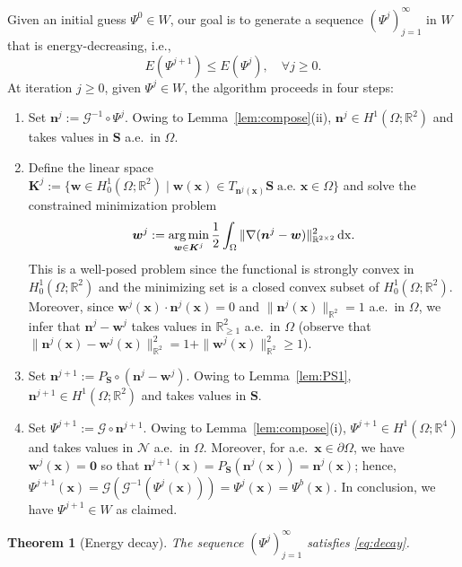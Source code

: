 \documentclass[a4paper,11pt]{article}
\newtheorem{theorem}{Theorem}[section]
\theoremstyle{definition}
\theoremstyle{remark}
\numberwithin{equation}{section}
\newcommand{\dx}{\,{\rm dx}}
\newcommand{\Real}{\mathbb{R}}
\newcommand{\bn}{{\boldsymbol n}}
\newcommand{\bw}{{\boldsymbol w}}
\newcommand{\bx}{{\boldsymbol x}}
\newcommand{\bK}{{\boldsymbol K}}
\newcommand{\bS}{{\boldsymbol S}}
\newcommand{\bzero}{{\boldsymbol 0}}
\newcommand{\calG}{\mathcal{G}}
\newcommand{\calN}{\mathcal{N}}
\DeclareMathOperator*{\argmin}{arg\,min}
\newcommand{\SCAL}{{\cdot}}
\begin{document}
Given an initial guess $\Psi^0\in W$, our goal is to generate a sequence $(\Psi^j)_{j=1}^\infty$ in $W$ that is energy-decreasing, i.e.,
\begin{equation} \label{eq:decay}
E(\Psi^{j+1}) \le E(\Psi^j), \quad \forall j\ge0.
\end{equation}
At iteration $j\ge0$, given $\Psi^j\in W$, 
the algorithm proceeds in four steps:
\begin{enumerate}
\item Set $\bn^j:= \calG^{-1} \circ \Psi^j$. Owing to Lemma~\ref{lem:compose}(ii), $\bn^j  \in H^1(\Omega;\Real^2)$ and takes values in $\bS$ a.e.~in $\Omega$.
\item Define the linear space $\bK^j := \{\bw \in H^1_0(\Omega;\Real^2)\;|\;
\bw(\bx) \in T_{\bn^j(\bx)}\bS \; \text{a.e. $\bx\in\Omega$}\}$ and solve the constrained minimization problem
\begin{equation} \label{eq:min_step2}
\bw^j := \argmin_{\bw \in \bK^j} \frac12 \int_\Omega \|\nabla (\bn^j-\bw)\|_{\Real^{2\times 2}}^2 \dx.
\end{equation}
This is a well-posed problem since the functional is strongly convex in $H^1_0(\Omega;\Real^2)$ and the minimizing set is a closed convex subset of $H^1_0(\Omega;\Real^2)$. Moreover, since $\bw^j(\bx)\SCAL \bn^j(\bx)=0$ and $\|\bn^j(\bx)\|_{\Real^2}=1$ a.e.~in $\Omega$, we infer that $\bn^j-\bw^j$ takes values in $\Real^2_{\ge1}$ a.e.~in $\Omega$ (observe that $\|\bn^j(\bx)-\bw^j(\bx)\|_{\Real^2}^2 = 1 + \|\bw^j(\bx)\|_{\Real^2}^2 \ge 1$).
\item Set $\bn^{j+1}:= P_{\bS} \circ (\bn^j-\bw^j)$. Owing to Lemma~\ref{lem:PS1}, $\bn^{j+1}\in H^1(\Omega;\Real^2)$ and takes values in $\bS$.
\item Set $\Psi^{j+1}:=\calG \circ \bn^{j+1}$. Owing to Lemma~\ref{lem:compose}(i), $\Psi^{j+1}  \in H^1(\Omega;\Real^4)$ and takes values in $\calN$ a.e.~in $\Omega$. Moreover, for a.e.~$\bx\in\partial\Omega$, we have $\bw^j(\bx)=\bzero$ so that $\bn^{j+1}(\bx)=P_{\bS}(\bn^j(\bx))=\bn^j(\bx)$; hence, $\Psi^{j+1}(\bx) = \calG(\calG^{-1}(\Psi^j(\bx))) = \Psi^j(\bx) = \Psi^b(\bx)$. In conclusion, we have $\Psi^{j+1}\in W$ as claimed.
\end{enumerate}


\begin{theorem}[Energy decay] \label{th:decay_cont}
The sequence $(\Psi^j)_{j=1}^\infty$ satisfies \eqref{eq:decay}.
\end{theorem}
\end{document}
